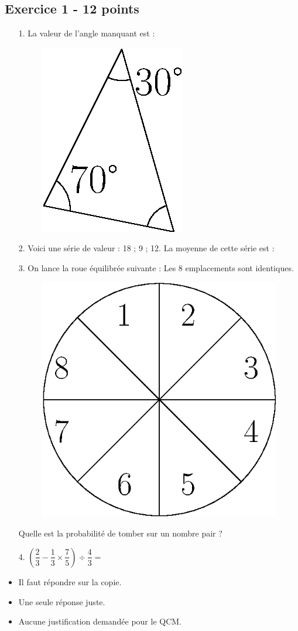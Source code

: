 \newpage \strut \newpage

\subsection*{Exercice 1 - 12 points}

\medskip

\begin{multicols}{2}

    \begin{enumerate}
        \item[1.] La valeur de l’angle manquant est :
        \begin{figure}[H]
            \centering
            \includegraphics[width=0.2\linewidth]{qcm1.eps}
        \end{figure}

        \item[2.] Voici une série de valeur : 18 ; 9 ; 12. \newline 
        La moyenne de cette série est : 

        \item[3.] On lance la roue équilibrée suivante : \newline 
        Les 8 emplacements sont identiques.
        \begin{figure}[H]
            \centering
            \includegraphics[width=0.2\linewidth]{qcm3.eps}
        \end{figure}
        Quelle est la probabilité de tomber sur un nombre pair ? 
        \item[4.] $\left( \dfrac{2}{3} - \dfrac{1}{3} \times \dfrac{7}{5} \right) \div \dfrac{4}{3} = $
    \end{enumerate} \columnbreak
    
    \begin{itemize}[label={$\bullet$}]
        \item Il faut répondre sur la copie. 
        \item Une seule réponse juste.
        \item Aucune justification demandée pour le QCM.
    \end{itemize}


\end{multicols}
